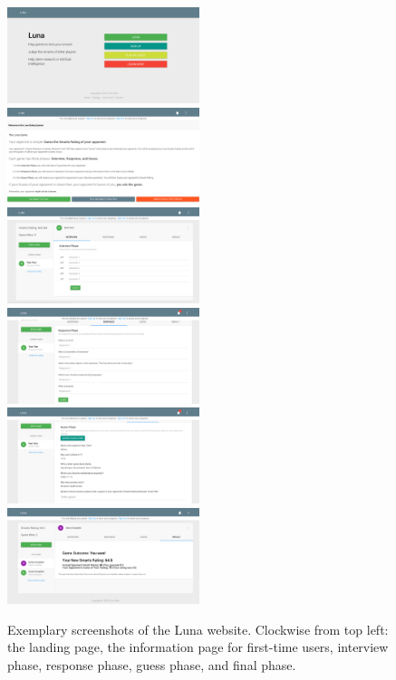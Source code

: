 \begin{figure}
\includegraphics[width=0.5\textwidth]{figures/screen1.png}
\includegraphics[width=0.5\textwidth]{figures/screen2.png}
\includegraphics[width=0.5\textwidth]{figures/screen3.png}
\includegraphics[width=0.5\textwidth]{figures/screen4.png}
\includegraphics[width=0.5\textwidth]{figures/screen5.png}
\includegraphics[width=0.5\textwidth]{figures/screen6.png}
\caption{Exemplary screenshots of the Luna website. Clockwise from top left: the landing page, the information page for first-time users, interview phase, response phase, guess phase, and final phase.}
\label{screenshotpic}
\end{figure}
